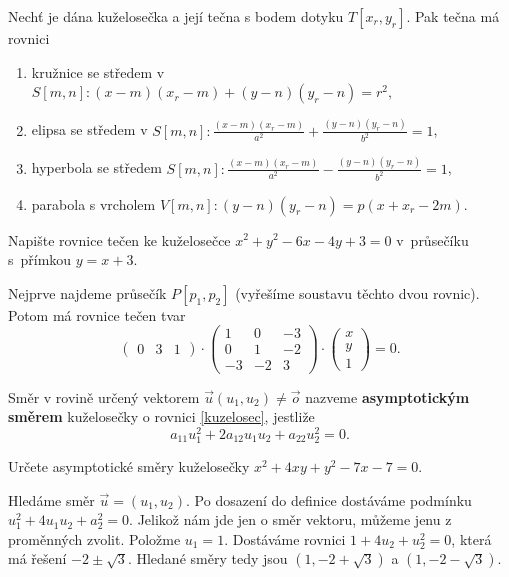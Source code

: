 \begin{veta}
    Nechť je dána kuželosečka a její tečna s bodem dotyku $T[x_r,y_r].$ Pak tečna
    má rovnici
    \begin{enumerate}[$i.$]
    \item kružnice se středem v $S[m,n]\colon (x-m)(x_r-m)+(y-n)(y_r-n)=r^2,$
   	\item elipsa se středem v $S[m,n]\colon \frac{(x-m)(x_r-m)}{a^2}+\frac{(y-n)(y_r-n)}{b^2}=1$,
   	\item hyperbola se středem $S[m,n]\colon \frac{(x-m)(x_r-m)}{a^2}-\frac{(y-n)(y_r-n)}{b^2}=1$,
   	\item parabola s vrcholem $V[m,n]\colon (y-n)(y_r-n)=p(x+x_r-2m).$
    \end{enumerate}
\end{veta}

\begin{priklad}
Napište rovnice tečen ke kuželosečce $x^2+y^2-6x-4y+3=0$ v~průsečíku s~přímkou $y=x+3$.
\end{priklad}

\begin{reseni}
Nejprve najdeme průsečík $P[p_1,p_2]$ (vyřešíme soustavu těchto dvou rovnic).
Potom má rovnice tečen tvar
$$\begin{pmatrix}
    0 & 3 & 1
\end{pmatrix}\cdot \begin{pmatrix}
    1 & 0 & -3\\
    0 & 1 & -2 \\
    -3 & -2 & 3
\end{pmatrix}\cdot \begin{pmatrix}
    x \\
    y \\
    1
\end{pmatrix}=0.$$
\end{reseni}

\begin{definition}
    Směr v rovině určený vektorem $\vec u(u_1, u_2)\ne \vec o$ nazveme
    \textbf{asymptotickým směrem} kuželosečky o rovnici \ref{kuzelosec}, jestliže
    $$a_{11}u_1^2 + 2a_{12}u_1u_2+a_{22}u_2^2=0.$$
\end{definition}

\begin{priklad}
Určete asymptotické směry kuželosečky $x^2+4xy+y^2-7x-7=0.$
\end{priklad}

\begin{reseni}
Hledáme směr $\vec u=(u_1,u_2).$ Po dosazení do definice dostáváme podmínku $u_1^2 + 4u_1u_2 + a_2^2 = 0$.
Jelikož nám jde jen o směr vektoru, můžeme jenu z proměnných zvolit. Položme $u_1=1$. Dostáváme rovnici
$1+4u_2+u_2^2 = 0$, která má řešení $-2 \pm \sqrt{3}$. Hledané směry tedy jsou
$(1, -2 + \sqrt{3})$ a $(1, -2 -\sqrt{3})$.
\end{reseni}

